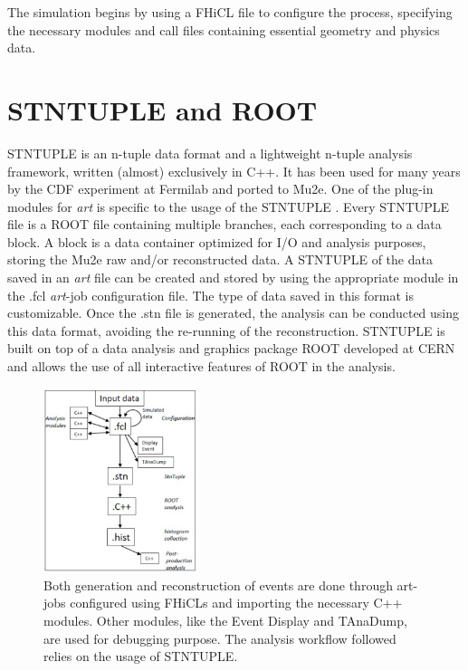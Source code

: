 The simulation begins by using a FHiCL file to configure the process, specifying 
the necessary modules and call files containing essential geometry and physics data.

\section{STNTUPLE and ROOT}
STNTUPLE is an n-tuple data format and a lightweight n-tuple analysis framework, 
written (almost) exclusively in C++. It has been used for many years by the CDF experiment at Fermilab 
and ported to Mu2e. One of the plug-in modules for \textit{art} is specific to the 
usage of the STNTUPLE \cite{stntuple}. Every STNTUPLE file is a ROOT file containing multiple branches, 
each corresponding to a data block. A block is a data container optimized for I/O and 
analysis purposes, storing the Mu2e raw and/or reconstructed data. A STNTUPLE of the 
data saved in an \textit{art} file can be created and stored by using the appropriate 
module in the .fcl \textit{art}-job configuration file. The type of data saved in this 
format is customizable. Once the .stn file is generated, the analysis can be conducted 
using this data format, avoiding the re-running of the reconstruction. STNTUPLE is built 
on top of a data analysis and graphics package ROOT developed at CERN and allows the use 
of all interactive features of ROOT in the analysis.


\begin{figure}[!h]
    \centering
    \includegraphics[width =0.4\textwidth]{figures/png/Screenshot_20240809_174458.png}
    \caption[Mu2e simulation and data handling.]{Both generation and reconstruction of events are done through art-jobs
    configured using FHiCLs and importing the necessary C++ modules. Other modules,
    like the Event Display and TAnaDump, are used for debugging purpose. The analysis
    workflow followed relies on the usage of STNTUPLE.}
    \label{fig:multistage}
\end{figure}

